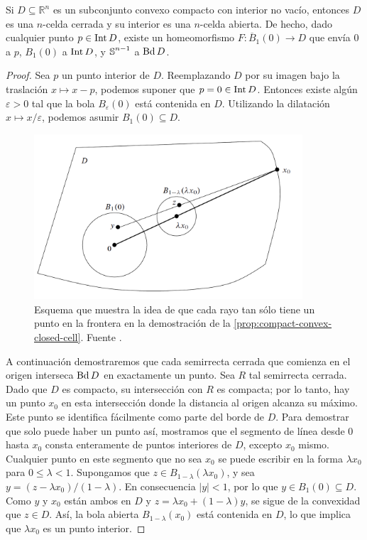 \begin{proposicion}
	\label{prop:compact-convex-closed-cell} Si $D \subseteq \mathbb{R}^{n}$ es un subconjunto
	convexo compacto con interior no vacío, entonces $D$ es una $n$-celda cerrada
	y su interior es una $n$-celda abierta. De hecho, dado cualquier punto
	$p \in \operatorname{Int} D$, existe un homeomorfismo $F : \overline{B}_{1}(0) \to D$ que
	envía $0$ a $p$, $B_{1}(0)$ a $\operatorname{Int} D$, y $\operatorname{\mathbb{S}}^{n-1}$ a $\operatorname{Bd} D$.
\end{proposicion}
\begin{proof}
	Sea $p$ un punto interior de $D$. Reemplazando $D$ por su imagen bajo la
	traslación $x \mapsto x - p$, podemos suponer que $p = 0 \in \operatorname{Int} D$.
	Entonces existe algún $\varepsilon > 0$ tal que la bola $B_{\varepsilon}(0)$
	está contenida en $D$. Utilizando la dilatación $x \mapsto x/\varepsilon$,
	podemos asumir $B_{1}(0) \subseteq D$.
	\begin{figure}
		\centering
		\includegraphics[width=10cm]{img/proof-cell.png}
		\caption{Esquema que muestra la idea de que cada rayo tan sólo tiene un
			punto en la frontera en la demostración de la
			\autoref{prop:compact-convex-closed-cell}. Fuente \cite{lee2010introduction}.}
	\end{figure}
	A continuación demostraremos que cada semirrecta cerrada que comienza en el origen
	interseca $\operatorname{Bd} D$ en exactamente un punto. Sea $R$ tal semirrecta cerrada. Dado
	que $D$ es compacto, su intersección con $R$ es compacta; por lo tanto, hay un
	punto $x_{0}$ en esta intersección donde la distancia al origen alcanza su
	máximo. Este punto se identifica fácilmente como parte del borde de $D$. Para
	demostrar que solo puede haber un punto así, mostramos que el segmento de línea
	desde $0$ hasta $x_{0}$ consta enteramente de puntos interiores de $D$,
	excepto $x_{0}$ mismo. Cualquier punto en este segmento que no sea $x_{0}$ se puede
	escribir en la forma $\lambda x_{0}$ para $0 \leq \lambda < 1$. Supongamos que
	$z \in B_{1-\lambda}(\lambda x_{0})$, y sea $y = (z - \lambda x_{0})/(1 - \lambda
	)$. En consecuencia $|y| < 1$, por lo que $y \in B_{1}(0) \subseteq D$. Como
	$y$ y $x_{0}$ están ambos en $D$ y $z = \lambda x_{0}+ (1 - \lambda)y$, se sigue
	de la convexidad que $z \in D$. Así, la bola abierta $B_{1-\lambda}(x_{0})$ está
	contenida en $D$, lo que implica que $\lambda x_{0}$ es un punto interior.
	

\end{proof}
